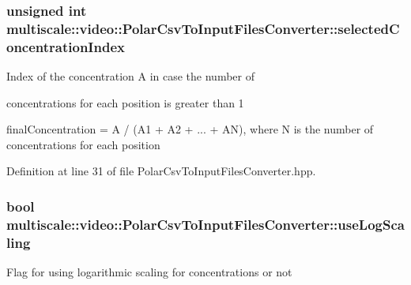 \hypertarget{classmultiscale_1_1video_1_1PolarCsvToInputFilesConverter_a121d592659f9f5075c8c78aa46c2950c}{
\subsubsection[{selected\-Concentration\-Index}]{\setlength{\rightskip}{0pt plus 5cm}unsigned int multiscale\-::video\-::\-Polar\-Csv\-To\-Input\-Files\-Converter\-::selected\-Concentration\-Index\hspace{0.3cm}{\ttfamily [private]}}}\label{classmultiscale_1_1video_1_1PolarCsvToInputFilesConverter_a121d592659f9f5075c8c78aa46c2950c}
\begin{DoxyVerb}    Index of the concentration A in case the number of
\end{DoxyVerb}
 concentrations for each position is greater than 1

final\-Concentration = A / (A1 + A2 + ... + A\-N), where N is the number of concentrations for each position 

Definition at line 31 of file Polar\-Csv\-To\-Input\-Files\-Converter.\-hpp.

\hypertarget{classmultiscale_1_1video_1_1PolarCsvToInputFilesConverter_af07bf56fc39bb226a6e2596f35ada0d7}{
\subsubsection[{use\-Log\-Scaling}]{\setlength{\rightskip}{0pt plus 5cm}bool multiscale\-::video\-::\-Polar\-Csv\-To\-Input\-Files\-Converter\-::use\-Log\-Scaling\hspace{0.3cm}{\ttfamily [private]}}}\label{classmultiscale_1_1video_1_1PolarCsvToInputFilesConverter_af07bf56fc39bb226a6e2596f35ada0d7}
Flag for using logarithmic scaling for concentrations or not 


